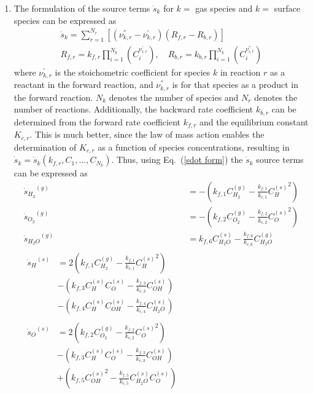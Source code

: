 \documentclass[a4paper]{report}
\newcommand{\eref}[1]{Eq.~(\ref{#1})}
\newcommand{\sk}{\dot{s}_k}
\newcommand{\skg}[1]{{\dot{s}_{#1}}^{(g)}}
\newcommand{\sks}[1]{{\dot{s}_{#1}}^{(s)}}
\newcommand{\kf}[1]{k_{f,#1}}
\newcommand{\kcf}[1]{\frac{k_{f,#1}}{k_{c,#1}}}
\newcommand{\cg}[1]{C_{#1}^{(g)}}
\newcommand{\cs}[1]{C_{#1}^{(s)}}
\begin{document}
\begin{enumerate}
\item
  The formulation of the source terms $\sk$ for $k=$ gas species and $k=$
  surface species can be expressed as
  \begin{equation}
    \label{sdot form}
    \begin{gathered}
      \sk = \sum_{r=1}^{N_r}\left[(\nu_{k,r}^{''} - \nu_{k,r}^{'})
      (R_{f,r} - R_{b,r})\right] \\
      R_{f,r} = k_{f,r}\prod_{i=1}^{N_k}(C_i^{\nu_{i,r}^{'}}), \quad
      R_{b,r} = k_{b,r}\prod_{i=1}^{N_k}(C_i^{\nu_{i,r}^{''}})
    \end{gathered}
  \end{equation}
  where $\nu_{k,r}^{'}$ is the stoichometric coefficient for species $k$ in
  reaction $r$ as a reactant in the forward reaction, and $\nu_{k,r}^{''}$ is
  for that species as a product in the forward reaction.  $N_k$ denotes the
  number of species and $N_r$ denotes the number of reactions.  Additionally,
  the backward rate coefficient $k_{b,r}$ can be determined from the forward
  rate coefficient $k_{f,r}$ and the equilibrium constant $K_{c,r}$.  This is much
  better, since the law of mass action enables the determination of $K_{c,r}$ as
  a function of species concentrations, resulting in $\sk =
  \sk(k_{f,r},C_1,\dots,C_{N_k})$. Thus, using \eref{sdot form} the $\sk$ source
  terms can be expressed as
  \begin{align}
    \skg{H_2}  &= -\left( \kf{1} \cg{H_2} - \kcf{1} {\cs{H}}^2 \right) \\
    \skg{O_2}  &= -\left( \kf{2} \cg{O_2} - \kcf{2} {\cs{O}}^2 \right) \\
    \skg{H_2O} &= \kf{6} \cs{H_2O} - \kcf{6} \cg{H_2O} \\
    \begin{split}
      \sks{H}    &= 2 \left( \kf{1} \cg{H_2} - \kcf{1} {\cs{H}}^2 \right) \\
      &-\left( \kf{3} \cs{H} \cs{O} - \kcf{3} \cs{OH} \right) \\
      &-\left( \kf{4} \cs{H} \cs{OH} - \kcf{4} \cs{H_2O} \right)
    \end{split} \\
    \begin{split}
      \sks{O} &= 2 \left( \kf{2} \cg{O_2} - \kcf{2} {\cs{O}}^2 \right) \\
      &-\left( \kf{3} \cs{H} \cs{O} - \kcf{3} \cs{OH} \right) \\
      &+\left( \kf{5} {\cs{OH}}^2 - \kcf{5} \cs{H_2O} \cs{O} \right)
    \end{split} \\

\end{align}
\end{enumerate}
\end{document}
